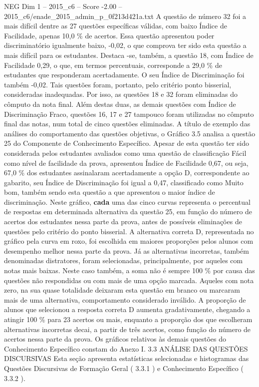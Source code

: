 \begin{textsample}{NEG Dim 1 – 2015\_c6 – Score -2.00 – 2015\_c6/enade\_2015\_admin\_p\_0f213d421a.txt}
A questão de número 32 foi a mais difícil dentre as 27 questões específicas válidas, com baixo Índice de Facilidade, apenas 10,0 \% de acertos.
Essa questão apresentou poder discriminatório igualmente baixo, -0,02, o que comprova ter sido esta questão a mais difícil para os estudantes.
Destaca -se, também, a questão 18, com Índice de Facilidade 0,29, o que, em termos percentuais, corresponde a 29,0 \% de estudantes que responderam acertadamente.
O seu Índice de Discriminação foi também -0,02.
Tais questões foram, portanto, pelo critério ponto bisserial, consideradas inadequadas.
Por isso, as questões 18 e 32 foram eliminadas do cômputo da nota final.
Além destas duas, as demais questões com Índice de Discriminação Fraco, questões 16, 17 e 27 tampouco foram utilizadas no cômputo final das notas, num total de cinco questões eliminadas.
A título de exemplo das análises do comportamento das questões objetivas, o Gráfico 3.5 analisa a questão 25 do Componente de Conhecimento Específico.
Apesar de esta questão ter sido considerada pelos estudantes avaliados como uma questão de classificação Fácil como nível de facilidade da prova, apresentou Índice de Facilidade 0,67, ou seja, 67,0 \% dos estudantes assinalaram acertadamente a opção D, correspondente ao gabarito, seu Índice de Discriminação foi igual a 0,47, classificado como Muito bom, também sendo esta questão a que apresentou o maior índice de discriminação.
Neste gráfico, \textbf{cada} uma das cinco curvas representa o percentual de respostas em determinada alternativa da questão 25, em função do número de acertos dos estudantes nessa parte da prova, antes de possíveis eliminações de questões pelo critério do ponto bisserial.
A alternativa correta D, representada no gráfico pela curva em roxo, foi escolhida em maiores proporções pelos alunos com desempenho melhor nessa parte da prova.
Já as alternativas incorretas, também denominadas distratores, foram selecionadas, principalmente, por aqueles com notas mais baixas.
Neste caso também, a soma não é sempre 100 \% por causa das questões não respondidas ou com mais de uma opção marcada.
Aqueles com nota zero, na sua quase totalidade deixaram esta questão em branco ou marcaram mais de uma alternativa, comportamento considerado inválido.
A proporção de alunos que selecionou a resposta correta D aumenta gradativamente, chegando a atingir 100 \% para 23 acertos ou mais, enquanto a proporção dos que escolheram alternativas incorretas decai, a partir de três acertos, como função do número de acertos nessa parte da prova.
Os gráficos relativos às demais questões do Conhecimento Específico constam do Anexo I. 3.3 ANÁLISE DAS QUESTÕES DISCURSIVAS Esta seção apresenta estatísticas selecionadas e histogramas das Questões Discursivas de Formação Geral ( 3.3.1 ) e Conhecimento Específico ( 3.3.2 ).

\end{textsample}

